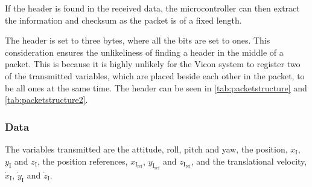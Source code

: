 If the header is found in the received data, the microcontroller can then extract the information and checksum as the packet is of a fixed length. 

The header is set to three bytes, where all the bits are set to ones. This consideration ensures the unlikeliness of finding a header in the middle of a packet. This is because it is highly unlikely for the Vicon system to register two of the transmitted variables, which are placed beside each other in the packet, to be all ones at the same time. The header can be seen in \autoref{tab:packetstructure} and \autoref{tab:packetstructure2}.

\subsubsection{Data}
The variables transmitted are the attitude, roll, pitch and yaw, the position, $x_{\mathrm{I}}$, $y_{\mathrm{I}}$ and $z_{\mathrm{I}}$, the position references, $x_{\mathrm{I_{ref}}}$, $y_{\mathrm{I_{ref}}}$ and $z_{\mathrm{I_{ref}}}$, and the translational velocity, $\dot{x}_{\mathrm{I}}$, $\dot{y}_{\mathrm{I}}$ and $\dot{z}_{\mathrm{I}}$. 

